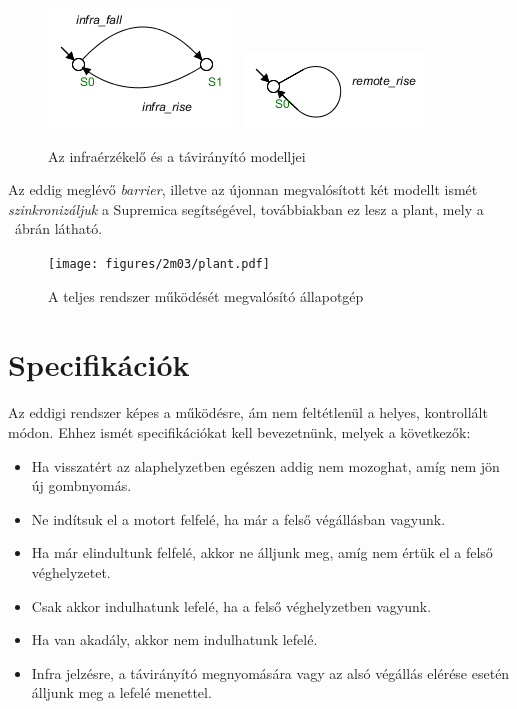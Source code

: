 \begin{figure}
	\centering
	\includegraphics[keepaspectratio]{figures/2m03/b_infra.png}	\includegraphics[keepaspectratio]{figures/2m03/b_remote.png}
	\caption{Az infraérzékelő és a távirányító modelljei}
	\label{fig:InfraRemote}
\end{figure}

Az eddig meglévő \textit{barrier}, illetve az újonnan megvalósított két modellt ismét \textit{szinkronizáljuk} a Supremica segítségével, továbbiakban ez lesz a plant, mely a ~ábrán látható.

\begin{figure}
	\centering
	\texttt{[image: figures/2m03/plant.pdf]}
	\caption{A teljes rendszer működését megvalósító állapotgép}
	\label{fig:Plant}
\end{figure}

\section{Specifikációk}
Az eddigi rendszer képes a működésre, ám nem feltétlenül a helyes, kontrollált módon. Ehhez ismét specifikációkat kell bevezetnünk, melyek a következők:
\begin{itemize}
	\item Ha visszatért az alaphelyzetben egészen addig nem mozoghat, amíg nem jön új gombnyomás.
	\item Ne indítsuk el a motort felfelé, ha már a felső végállásban vagyunk.
	\item Ha már elindultunk felfelé, akkor ne álljunk meg, amíg nem értük el a felső véghelyzetet.
	\item Csak akkor indulhatunk lefelé, ha a felső véghelyzetben vagyunk.
	\item Ha van akadály, akkor nem indulhatunk lefelé.
	\item Infra jelzésre, a távirányító megnyomására vagy az alsó végállás elérése esetén álljunk meg a lefelé menettel.
\end{itemize}

